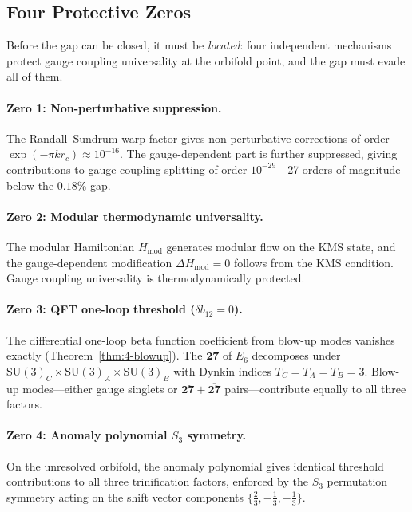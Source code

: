 \subsection{Four Protective Zeros}
\label{sec:4-protective-zeros}

Before the gap can be closed, it must be \emph{located}: four independent mechanisms protect gauge coupling universality at the orbifold point, and the gap must evade all of them.

\paragraph{Zero 1: Non-perturbative suppression.}
The Randall--Sundrum warp factor gives non-perturbative corrections of order $\exp(-\pi k r_c) \approx 10^{-16}$.  The gauge-dependent part is further suppressed, giving contributions to gauge coupling splitting of order $10^{-29}$---27 orders of magnitude below the $0.18\%$ gap.

\paragraph{Zero 2: Modular thermodynamic universality.}
The modular Hamiltonian $H_{\mathrm{mod}}$ generates modular flow on the KMS state, and the gauge-dependent modification $\Delta H_{\mathrm{mod}} = 0$ follows from the KMS condition.  Gauge coupling universality is thermodynamically protected.

\paragraph{Zero 3: QFT one-loop threshold ($\delta b_{12} = 0$).}
The differential one-loop beta function coefficient from blow-up modes vanishes exactly (Theorem~\ref{thm:4-blowup}).  The $\mathbf{27}$ of $E_6$ decomposes under $\mathrm{SU}(3)_C \times \mathrm{SU}(3)_A \times \mathrm{SU}(3)_B$ with Dynkin indices $T_C = T_A = T_B = 3$.  Blow-up modes---either gauge singlets or $\mathbf{27} + \overline{\mathbf{27}}$ pairs---contribute equally to all three factors.

\paragraph{Zero 4: Anomaly polynomial $S_3$ symmetry.}
On the unresolved orbifold, the anomaly polynomial gives identical threshold contributions to all three trinification factors, enforced by the $S_3$ permutation symmetry acting on the shift vector components $\{\tfrac{2}{3}, -\tfrac{1}{3}, -\tfrac{1}{3}\}$.

